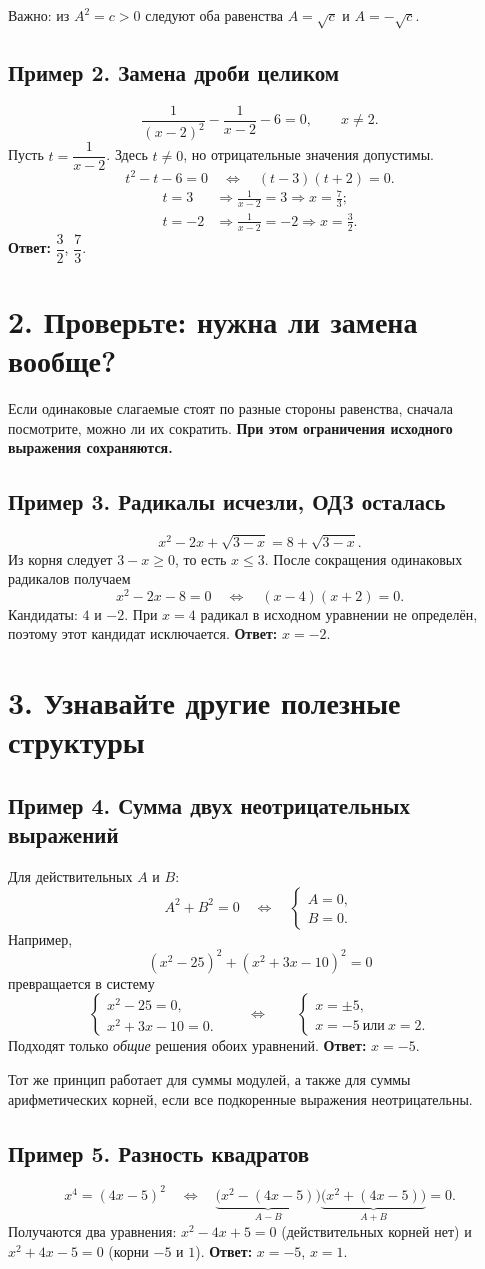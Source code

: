 \documentclass[a4paper,12pt]{article}
\newcommand{\key}[1]{{\color{darkaccent}\textbf{#1}}}
\newcommand{\note}[1]{{\small\color{quiet}#1}}
\newcommand{\headsec}[1]{\section*{\color{darkaccent}#1}\vspace{-5pt}{\color{hairline}\rule{\linewidth}{0.55pt}}\par\vspace{1pt}}
\newcommand{\headsub}[1]{\subsection*{\color{accent}#1}}
\begin{document}
\note{Важно: из \(A^2=c>0\) следуют оба равенства \(A=\sqrt c\) и \(A=-\sqrt c\).}

\headsub{Пример 2. Замена дроби целиком}
\[
 \frac{1}{(x-2)^2}-\frac{1}{x-2}-6=0,\qquad x\ne2.
\]
Пусть \(t=\dfrac1{x-2}\). Здесь \(t\ne0\), но отрицательные значения допустимы.
\[
 t^2-t-6=0\quad\Longleftrightarrow\quad(t-3)(t+2)=0.
\]
\[
 \begin{aligned}
 t=3&\Longrightarrow\frac1{x-2}=3\Longrightarrow x=\frac73;\\
 t=-2&\Longrightarrow\frac1{x-2}=-2\Longrightarrow x=\frac32.
 \end{aligned}
\]
\key{Ответ:} \(\dfrac32\), \(\dfrac73\).

\clearpage
\headsec{2. Проверьте: нужна ли замена вообще?}
Если одинаковые слагаемые стоят по разные стороны равенства, сначала посмотрите,
можно ли их сократить. \key{При этом ограничения исходного выражения сохраняются.}

\headsub{Пример 3. Радикалы исчезли, ОДЗ осталась}
\[
 x^2-2x+\sqrt{3-x}=8+\sqrt{3-x}.
\]
Из корня следует \(3-x\ge0\), то есть \(x\le3\). После сокращения одинаковых
радикалов получаем
\[
 x^2-2x-8=0\quad\Longleftrightarrow\quad(x-4)(x+2)=0.
\]
Кандидаты: \(4\) и \(-2\). При \(x=4\) радикал в исходном уравнении не определён,
поэтому этот кандидат исключается. \key{Ответ:} \(x=-2\).

\headsec{3. Узнавайте другие полезные структуры}
\headsub{Пример 4. Сумма двух неотрицательных выражений}
Для действительных \(A\) и \(B\):
\[
 A^2+B^2=0\quad\Longleftrightarrow\quad
 \begin{cases}A=0,\\B=0.\end{cases}
\]
Например,
\[
 (x^2-25)^2+(x^2+3x-10)^2=0
\]
превращается в систему
\[
 \begin{cases}x^2-25=0,\\x^2+3x-10=0.\end{cases}
 \qquad\Longleftrightarrow\qquad
 \begin{cases}x=\pm5,\\x=-5\ \text{или}\ x=2.\end{cases}
\]
Подходят только \emph{общие} решения обоих уравнений. \key{Ответ:} \(x=-5\).

\note{Тот же принцип работает для суммы модулей, а также для суммы арифметических корней,
если все подкоренные выражения неотрицательны.}

\headsub{Пример 5. Разность квадратов}
\[
 x^4=(4x-5)^2\quad\Longleftrightarrow\quad
 \underbrace{\bigl(x^2-(4x-5)\bigr)}_{A-B}
 \underbrace{\bigl(x^2+(4x-5)\bigr)}_{A+B}=0.
\]
Получаются два уравнения: \(x^2-4x+5=0\) (действительных корней нет) и
\(x^2+4x-5=0\) (корни \(-5\) и \(1\)).
\key{Ответ:} \(x=-5\), \(x=1\).
\end{document}
